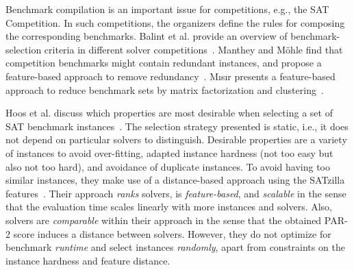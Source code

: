 \documentclass[runningheads]{llncs}
\begin{document}
Benchmark compilation is an important issue for competitions, e.g., the SAT Competition.
In such competitions, the organizers define the rules for composing the corresponding benchmarks.
Balint et al. provide an overview of benchmark-selection criteria in different solver competitions~\cite{balint2015overview}.
Manthey and Möhle find that competition benchmarks might contain redundant instances, and propose a feature-based approach to remove redundancy~\cite{manthey2016better}.
M{\i}s{\i}r presents a feature-based approach to reduce benchmark sets by matrix factorization and clustering~\cite{misir2021benchmark}.

Hoos et al. discuss which properties are most desirable when selecting a set of SAT benchmark instances~\cite{HoosKSS13}.
The selection strategy presented is static, i.e., it does not depend on particular solvers to distinguish.
Desirable properties are a variety of instances to avoid over-fitting, adapted instance hardness (not too easy but also not too hard), and avoidance of duplicate instances.
To avoid having too similar instances, they make use of a distance-based approach using the SATzilla features~\cite{XuHHL08,features}.
Their approach \emph{ranks} solvers, is \emph{feature-based}, and \emph{scalable} in the sense that the evaluation time scales linearly with more instances and solvers.
Also, solvers are \emph{comparable} within their approach in the sense that the obtained PAR-2 score induces a distance between solvers.
However, they do not optimize for benchmark \emph{runtime} and select instances \emph{randomly}, apart from constraints on the instance hardness and feature distance.

\end{document}
